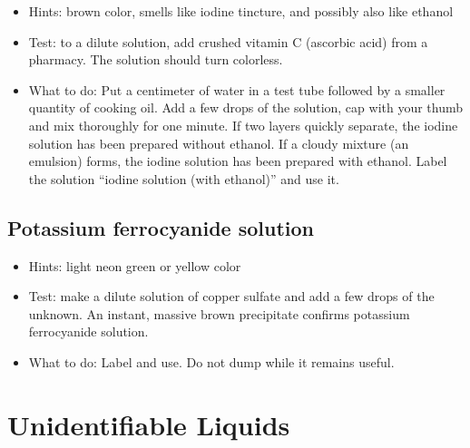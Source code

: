 \begin{itemize}

\item{Hints: brown color, 
smells like iodine tincture, 
and possibly also like ethanol}

\item{Test: to a dilute solution, 
add crushed vitamin C (ascorbic acid) from a pharmacy. 
The solution should turn colorless.}

\item{What to do: Put a centimeter of water in a test tube 
followed by a smaller quantity of cooking oil. 
Add a few drops of the solution, 
cap with your thumb and mix thoroughly for one minute. 
If two layers quickly separate, 
the iodine solution has been prepared without ethanol. 
If a cloudy mixture (an emulsion) forms, 
the iodine solution has been prepared with ethanol. 
Label the solution ``iodine solution (with ethanol)'' and use it.}

\end{itemize}

\subsection{Potassium ferrocyanide solution}

\begin{itemize}

\item{Hints: light neon green or yellow color}

\item{Test: make a dilute solution of copper sulfate and add a few drops of the unknown. 
An instant, 
massive brown precipitate confirms potassium ferrocyanide solution.}

\item{What to do: Label and use. 
Do not dump while it remains useful.}

\end{itemize}

\section{Unidentifiable Liquids}

